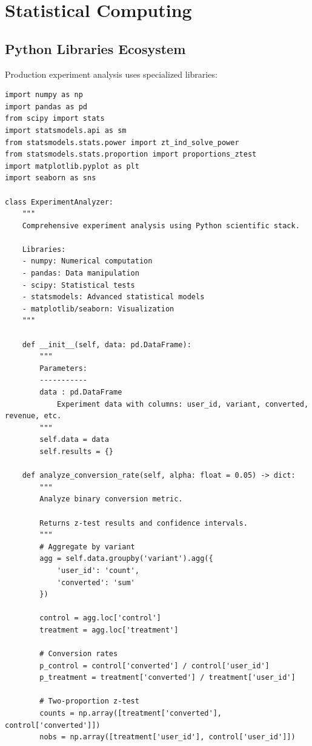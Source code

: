 \section{Statistical Computing}

\subsection{Python Libraries Ecosystem}

Production experiment analysis uses specialized libraries:

\lstset{language=Python, caption=Comprehensive Statistical Analysis with Python}
\begin{lstlisting}
import numpy as np
import pandas as pd
from scipy import stats
import statsmodels.api as sm
from statsmodels.stats.power import zt_ind_solve_power
from statsmodels.stats.proportion import proportions_ztest
import matplotlib.pyplot as plt
import seaborn as sns

class ExperimentAnalyzer:
    """
    Comprehensive experiment analysis using Python scientific stack.

    Libraries:
    - numpy: Numerical computation
    - pandas: Data manipulation
    - scipy: Statistical tests
    - statsmodels: Advanced statistical models
    - matplotlib/seaborn: Visualization
    """

    def __init__(self, data: pd.DataFrame):
        """
        Parameters:
        -----------
        data : pd.DataFrame
            Experiment data with columns: user_id, variant, converted, revenue, etc.
        """
        self.data = data
        self.results = {}

    def analyze_conversion_rate(self, alpha: float = 0.05) -> dict:
        """
        Analyze binary conversion metric.

        Returns z-test results and confidence intervals.
        """
        # Aggregate by variant
        agg = self.data.groupby('variant').agg({
            'user_id': 'count',
            'converted': 'sum'
        })

        control = agg.loc['control']
        treatment = agg.loc['treatment']

        # Conversion rates
        p_control = control['converted'] / control['user_id']
        p_treatment = treatment['converted'] / treatment['user_id']

        # Two-proportion z-test
        counts = np.array([treatment['converted'], control['converted']])
        nobs = np.array([treatment['user_id'], control['user_id']])


\end{lstlisting}
